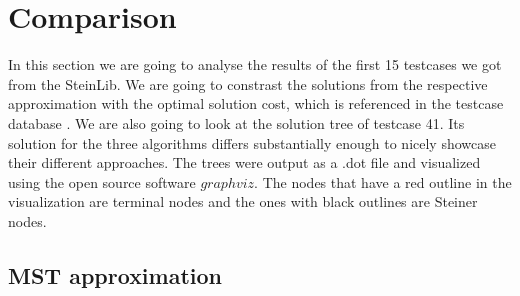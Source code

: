 
\chapter{Comparison}\label{chapter:04_comparison}

In this section we are going to analyse the results of the first 15 testcases we got from the SteinLib. We are going to constrast the solutions from the respective approximation with the optimal solution cost, which is referenced in the testcase database \cite{Dui93}. We are also going to look at the solution tree of testcase 41. Its solution for the three algorithms differs substantially enough to nicely showcase their different approaches. The trees were output as a .dot file and visualized using the open source software $graphviz$. The nodes that have a red outline in the visualization are terminal nodes and the ones with black outlines are Steiner nodes.

\section{MST approximation}

